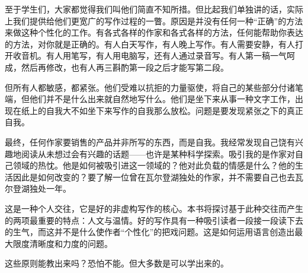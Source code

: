 至于学生们，大家都觉得我们叫他们简直不知所措。但比起我们单独讲的话，实际上我们提供给他们更宽广的写作过程的一瞥。原因是并没有任何一种“正确”的方法来做这种个性化的工作。有各式各样的作家和各式各样的方法，任何能帮助你表达的方法，对你就是正确的。有人白天写作，有人晚上写作。有人需要安静，有人打开收音机。有人用笔写，有人用电脑写，还有人通过录音写。有人第一稿一气呵成，然后再修改，也有人再三斟酌第一段之后才能写第二段。

但所有人都敏感，都紧张。他们受难以抗拒的力量驱使，将自己的某些部分付诸笔端，但他们并不是什么出来就自然地写什么。他们是坐下来从事一种文字工作，出现在纸上的自我大不如坐下来写作的自我那么放松。问题是要发现紧张之下的真正自我。

最终，任何作家要销售的产品并非所写的东西，而是自我。我经常发现自己饶有兴趣地阅读从未想过会有兴趣的话题——也许是某种科学探索。吸引我的是作家对自己领域的热忱。他是如何被吸引进这一领域的？他对此负载的情感是什么？他的生活因此是如何改变的？要了解一位曾在瓦尔登湖独处的作家，并不需要自己也去瓦尔登湖独处一年。

这是一种个人交往，它是好的非虚构写作的核心。本书将探讨基于此种交往而产生的两项最重要的特点：人文与温情。好的写作具有一种吸引读者一段接一段读下去的生气，而这并不是什么使作者“个性化”的把戏问题。这是如何运用语言创造出最大限度清晰度和力度的问题。

这些原则能教出来吗？恐怕不能。但大多数是可以学出来的。

